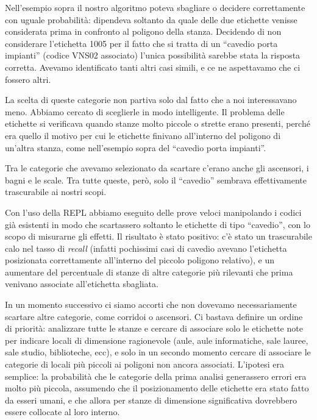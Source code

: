 \documentclass[12pt]{report}
\begin{document}
Nell'esempio sopra il nostro algoritmo poteva sbagliare o decidere 
correttamente con uguale probabilità: dipendeva soltanto da quale 
delle due etichette venisse considerata prima in confronto al 
poligono della stanza. Decidendo di non considerare l'etichetta 
1005 per il fatto che si tratta di un ``cavedio porta impianti'' 
(codice VNS02 associato) l'unica possibilità sarebbe stata
la risposta corretta. Avevamo identificato tanti altri casi simili, e
ce ne aspettavamo che ci fossero altri.

La scelta di queste categorie non partiva solo dal fatto che a noi
interessavano meno. Abbiamo cercato di sceglierle
in modo intelligente. Il problema delle etichette si verificava
quando stanze molto piccole o strette erano presenti,
perché era quello il motivo per cui le etichette finivano all'interno del
poligono di un'altra stanza, come nell'esempio sopra 
del ``cavedio porta impianti''.

Tra le categorie che avevamo selezionato da scartare c'erano anche 
gli ascensori, i bagni e le scale.
Tra tutte queste, però, solo il ``cavedio'' sembrava effettivamente
trascurabile ai nostri scopi.

Con l'uso della REPL abbiamo eseguito delle prove veloci manipolando i
codici già esistenti in modo che scartassero soltanto le etichette di
tipo ``cavedio'', con lo scopo di misurarne gli effetti.
Il risultato è stato positivo: c'è stato un
trascurabile calo nel tasso di \textit{recall} (infatti pochissimi casi
di cavedio avevano l'etichetta posizionata correttamente all'interno del
piccolo poligono relativo), e un aumentare del percentuale di stanze
di altre categorie più rilevanti che prima venivano associate 
all'etichetta sbagliata.

In un momento successivo ci siamo accorti che non dovevamo necessariamente
scartare altre categorie, come corridoi o ascensori. Ci bastava definire un
ordine di priorità: analizzare tutte le stanze e cercare di associare solo
le etichette note per indicare locali di dimensione ragionevole (aule, aule
informatiche, sale lauree, sale studio, biblioteche, ecc), e solo in un 
secondo momento cercare di associare le categorie di locali più piccoli ai
poligoni non ancora associati. L'ipotesi era semplice: la probabilità
che le categorie della prima analisi generassero errori
era molto più piccola, assumendo che il posizionamento delle etichette
era stato fatto da esseri umani, e che allora per stanze di dimensione
significativa dovrebbero essere collocate al loro interno.
\end{document}
